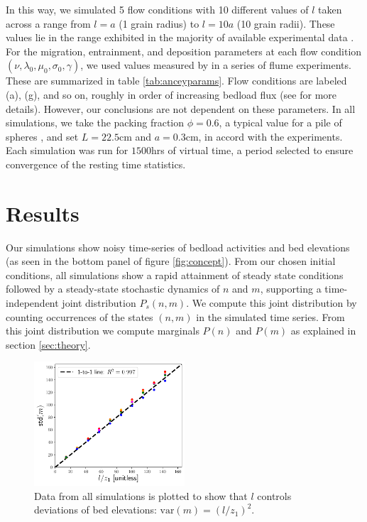 \documentclass[draft]{agujournal2018}
\begin{document}
In this way, we simulated 5 flow conditions with 10 different values of $l$ taken across a range from $l=a$ (1 grain radius) to $l=10a$ (10 grain radii).
These values lie in the range exhibited in the majority of available experimental data \citep{Wong2007,Singh2009,Martin2014}.
For the migration, entrainment, and deposition parameters at each flow condition $(\nu, \lambda_0, \mu_0, \sigma_0, \gamma)$, we used values measured by \citet{Ancey2008} in a series of flume experiments.
These are summarized in table \ref{tab:anceyparams}.
Flow conditions are labeled (a), (g), and so on, roughly in order of increasing bedload flux (see \citet{Ancey2008} for more details). 
However, our conclusions are not dependent on these parameters.
In all simulations, we take the packing fraction $\phi = 0.6$, a typical value for a pile of spheres \citep[e.g.][]{Bennett1972}, and set $L = 22.5$cm and $a = 0.3$cm, in accord with the \citet{Ancey2008} experiments.
Each simulation was run for $1500$hrs of virtual time, a period selected to ensure convergence of the resting time statistics.

\section{Results}

Our simulations show noisy time-series of bedload activities and bed elevations (as seen in the bottom panel of figure \ref{fig:concept}).
From our chosen initial conditions, all simulations show a rapid attainment of steady state conditions followed by a steady-state stochastic dynamics of $n$ and $m$, supporting a time-independent joint distribution $P_s(n,m)$. 
We compute this joint distribution by counting occurrences of the states $(n,m)$ in the simulated time series.
From this joint distribution we compute marginals $P(n)$ and $P(m)$ as explained in section \ref{sec:theory}.

\begin{figure}
	\centering
	\includegraphics[width=0.5\textwidth,keepaspectratio]{./figures/variance.pdf}
	\caption{Data from all simulations is plotted to show that $l$ controls deviations of bed elevations: $\text{var}(m) = (l/z_1)^2$. }
	\label{fig:var}
\end{figure}
\end{document}

